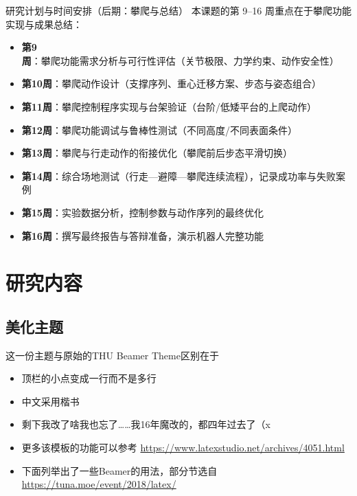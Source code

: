 \documentclass{beamer}
\begin{document}
\begin{frame}{研究计划与时间安排（后期：攀爬与总结）}
    本课题的第 9--16 周重点在于攀爬功能实现与成果总结：
    \begin{itemize}
        \item \textbf{第9周}：攀爬功能需求分析与可行性评估（关节极限、力学约束、动作安全性）
        \item \textbf{第10周}：攀爬动作设计（支撑序列、重心迁移方案、步态与姿态组合）
        \item \textbf{第11周}：攀爬控制程序实现与台架验证（台阶/低矮平台的上爬动作）
        \item \textbf{第12周}：攀爬功能调试与鲁棒性测试（不同高度/不同表面条件）
        \item \textbf{第13周}：攀爬与行走动作的衔接优化（攀爬前后步态平滑切换）
        \item \textbf{第14周}：综合场地测试（行走—避障—攀爬连续流程），记录成功率与失败案例
        \item \textbf{第15周}：实验数据分析，控制参数与动作序列的最终优化
        \item \textbf{第16周}：撰写最终报告与答辩准备，演示机器人完整功能
    \end{itemize}
\end{frame}




\section{研究内容}

\subsection{美化主题}

\begin{frame}{这一份主题与原始的THU Beamer Theme区别在于}
    \begin{itemize}
        \item 顶栏的小点变成一行而不是多行
        \item 中文采用楷书
        \item 剩下我改了啥我也忘了……我16年魔改的，都四年过去了（x
        \item 更多该模板的功能可以参考 \url{https://www.latexstudio.net/archives/4051.html}
        \item 下面列举出了一些Beamer的用法，部分节选自 \url{https://tuna.moe/event/2018/latex/}
    \end{itemize}
\end{frame}
\end{document}
